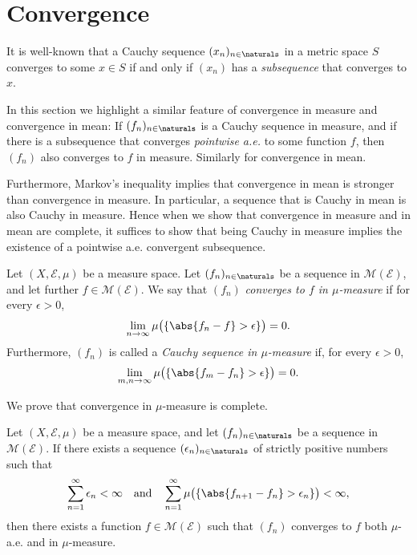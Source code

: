 \documentclass[article, a4paper, 11pt, oneside]{memoir}
\numberwithin{equation}{chapter}
\newcommand{\calE}{\mathcal{E}}
\newcommand{\measurable}{\mathcal{M}}
\begin{document}
\chapter{Convergence}

It is well-known that a Cauchy sequence $(x_n)_{n\in\naturals}$ in a metric space $S$ converges to some $x \in S$ if and only if $(x_n)$ has a \emph{subsequence} that converges to $x$.

In this section we highlight a similar feature of convergence in measure and convergence in mean: If $(f_n)_{n\in\naturals}$ is a Cauchy sequence in measure, and if there is a subsequence that converges \emph{pointwise a.e.} to some function $f$, then $(f_n)$ also converges to $f$ in measure. Similarly for convergence in mean.

Furthermore, Markov's inequality implies that convergence in mean is stronger than convergence in measure. In particular, a sequence that is Cauchy in mean is also Cauchy in measure. Hence when we show that convergence in measure and in mean are complete, it suffices to show that being Cauchy in measure implies the existence of a pointwise a.e. convergent subsequence.

\begin{definition}
    Let $(X,\calE,\mu)$ be a measure space. Let $(f_n)_{n\in\naturals}$ be a sequence in $\measurable(\calE)$, and let further $f \in \measurable(\calE)$. We say that $(f_n)$ \emph{converges to $f$ in $\mu$-measure} if for every $\epsilon > 0$,
    \begin{equation*}
        \lim_{n\to\infty} \mu\bigl( \{ \abs{f_n - f} > \epsilon \}\bigr) = 0.
    \end{equation*}
    Furthermore, $(f_n)$ is called a \emph{Cauchy sequence in $\mu$-measure} if, for every $\epsilon > 0$,
    \begin{equation*}
        \lim_{m,n\to\infty} \mu\bigl( \{ \abs{f_m - f_n} > \epsilon \} \bigr) = 0.
    \end{equation*}
\end{definition}

We prove that convergence in $\mu$-measure is complete.

\begin{lemma}
    \label{thm:convergence-in-measure-lemma}
    Let $(X,\calE,\mu)$ be a measure space, and let $(f_n)_{n\in\naturals}$ be a sequence in $\measurable(\calE)$. If there exists a sequence $(\epsilon_n)_{n\in\naturals}$ of strictly positive numbers such that
    \begin{equation}
        \label{eq:convergence-in-measure-complete-lemma}
        \sum_{n=1}^\infty \epsilon_n < \infty
        \quad \text{and} \quad
        \sum_{n=1}^\infty \mu \bigl( \{ \abs{f_{n+1} - f_n} > \epsilon_n \} \bigr) < \infty,
    \end{equation}
    then there exists a function $f \in \measurable(\calE)$ such that $(f_n)$ converges to $f$ both $\mu$-a.e. and in $\mu$-measure.
\end{lemma}
\end{document}
